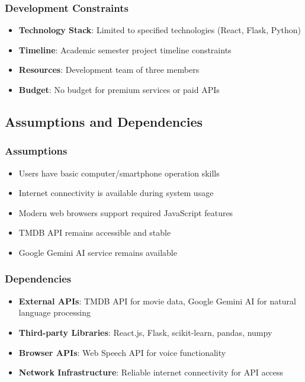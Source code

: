 \documentclass[12pt,a4paper]{article}
\begin{document}
\subsubsection{Development Constraints}
\begin{itemize}
    \item \textbf{Technology Stack}: Limited to specified technologies (React, Flask, Python)
    \item \textbf{Timeline}: Academic semester project timeline constraints
    \item \textbf{Resources}: Development team of three members
    \item \textbf{Budget}: No budget for premium services or paid APIs
\end{itemize}

\subsection{Assumptions and Dependencies}

\subsubsection{Assumptions}
\begin{itemize}
    \item Users have basic computer/smartphone operation skills
    \item Internet connectivity is available during system usage
    \item Modern web browsers support required JavaScript features
    \item TMDB API remains accessible and stable
    \item Google Gemini AI service remains available
\end{itemize}

\subsubsection{Dependencies}
\begin{itemize}
    \item \textbf{External APIs}: TMDB API for movie data, Google Gemini AI for natural language processing
    \item \textbf{Third-party Libraries}: React.js, Flask, scikit-learn, pandas, numpy
    \item \textbf{Browser APIs}: Web Speech API for voice functionality
    \item \textbf{Network Infrastructure}: Reliable internet connectivity for API access
\end{itemize}
\end{document}
